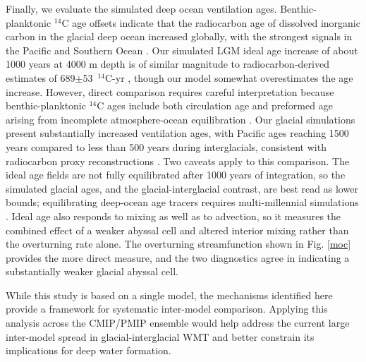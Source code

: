\documentclass[pdflatex,sn-nature]{sn-jnl}
\begin{document}
Finally, we evaluate the simulated deep ocean ventilation ages. Benthic-planktonic $^{14}$C age offsets indicate that the radiocarbon age of dissolved inorganic carbon in the glacial deep ocean increased globally, with the strongest signals in the Pacific and Southern Ocean \cite{Skinner2010,Skinner2017}. Our  simulated LGM ideal age increase of about 1000 years at 4000 m depth is of similar magnitude to radiocarbon-derived estimates of  689$\pm$53~$^{14}$C-yr \cite{Skinner2017}, though our model somewhat overestimates the age increase. However, direct comparison requires careful interpretation because benthic-planktonic $^{14}$C ages include both circulation age and preformed age arising from incomplete atmosphere-ocean equilibration \cite{Koeve2015}. Our glacial simulations present substantially increased ventilation ages, with Pacific ages reaching 1500 years compared to less than 500 years during interglacials, consistent with radiocarbon proxy reconstructions \cite{Skinner2017}. Two caveats apply to this comparison. The ideal age fields are not fully equilibrated after 1000 years of integration, so the simulated glacial ages, and the glacial-interglacial contrast, are best read as lower bounds; equilibrating deep-ocean age tracers requires multi-millennial simulations \cite{Millet2025}. Ideal age also responds to mixing as well as to advection, so it measures the combined effect of a weaker abyssal cell and altered interior mixing rather than the overturning rate alone. The overturning streamfunction shown in Fig. \ref{moc} provides the more direct measure, and the two diagnostics agree in indicating a substantially weaker glacial abyssal cell.

While this study is based on a single model, the mechanisms identified here provide a framework for systematic inter-model comparison. Applying this analysis across the CMIP/PMIP ensemble would help address the current large inter-model spread in glacial-interglacial WMT and better constrain its implications for deep water formation.
\end{document}
